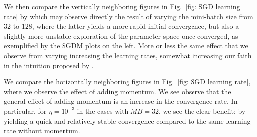 \documentclass[reprint, english, nofootinbib]{revtex4-2}
\begin{document}
We then compare the vertically neighboring figures in Fig.~\ref{fig: SGD learning rate} by which may observe directly the result of varying the mini-batch size from $32$ to $128$, where the latter yields a more rapid initial convergence, but also a slightly more unstable exploration of the parameter space once converged, as exemplified by the SGDM plots on the left. More or less the same effect that we observe from varying increasing the learning rates, somewhat increasing our faith in the intuition proposed by \textcite{ManyBodyML}.

We compare the horizontally neighboring figures in Fig.~\ref{fig: SGD learning rate}, where we observe the effect of adding momentum. We see observe that the general effect of adding momentum is an increase in the convergence rate. In particular, for $\eta = 10^{-3}$ in the cases with $MB = 32$, we see the clear benefit; by yielding a quick and relatively stable convergence compared to the same learning rate without momentum.
\end{document}
